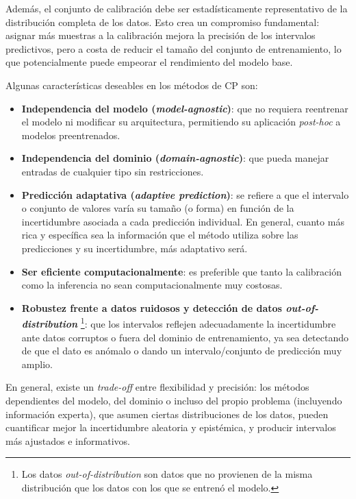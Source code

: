 Además, el conjunto de calibración debe ser estadísticamente representativo de la distribución completa de los 
datos. Esto crea un compromiso fundamental: asignar más muestras a la calibración mejora la precisión de los 
intervalos predictivos, pero a costa de reducir el tamaño del conjunto de entrenamiento, lo que potencialmente 
puede empeorar el rendimiento del modelo base.

Algunas características deseables en los métodos de CP son:

\begin{itemize}
    \item \textbf{Independencia del modelo (\textit{model-agnostic})}: que no requiera reentrenar el modelo ni 
    modificar su arquitectura, permitiendo su aplicación \textit{post-hoc} a modelos preentrenados.

    \item \textbf{Independencia del dominio (\textit{domain-agnostic})}: que pueda manejar entradas de 
    cualquier tipo sin restricciones. 
     
    \item \textbf{Predicción adaptativa (\textit{adaptive prediction})}: 
    se refiere a que el intervalo o conjunto de valores varía su tamaño (o forma) en función de la 
    incertidumbre asociada a cada predicción individual. En general, cuanto más rica y específica sea la 
    información que el método utiliza sobre las predicciones y su incertidumbre, más adaptativo será.

    \item \textbf{Ser eficiente computacionalmente}: es preferible que tanto la calibración como la inferencia 
    no sean computacionalmente muy costosas. 
    
    \item \textbf{Robustez frente a datos ruidosos y detección de datos \textit{out-of-distribution}}%
    \footnote{
        Los datos \textit{out-of-distribution} son datos que no provienen de la misma distribución que los 
        datos con los que se entrenó el modelo.
    }:
    que los intervalos reflejen adecuadamente la incertidumbre ante datos corruptos o fuera del dominio de 
    entrenamiento, ya sea detectando de que el dato es anómalo o dando un intervalo/conjunto de predicción
    muy amplio. 

\end{itemize}

En general, existe un \textit{trade-off} entre flexibilidad y precisión: los métodos dependientes del modelo,
del dominio o incluso del propio problema (incluyendo información experta), que asumen ciertas distribuciones 
de los datos, pueden cuantificar mejor la incertidumbre aleatoria y epistémica, y producir intervalos más 
ajustados e informativos. 


